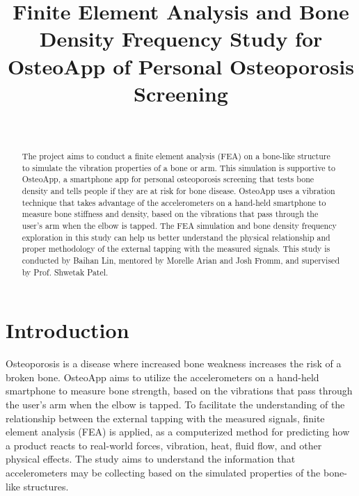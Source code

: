 \documentclass{sigchi}
\begin{document}
\title{Finite Element Analysis and Bone Density Frequency Study for OsteoApp of Personal Osteoporosis Screening}

\author{%
  \\
}

\maketitle

\begin{abstract}
The project aims to conduct a finite element analysis (FEA) on a bone-like structure to simulate the vibration properties of a bone or arm. This simulation is supportive to OsteoApp, a smartphone app for personal osteoporosis screening that tests bone density and tells people if they are at risk for bone disease. OsteoApp uses a vibration technique that takes advantage of the accelerometers on a hand-held smartphone to measure bone stiffness and density, based on the vibrations that pass through the user's arm when the elbow is tapped. The FEA simulation and bone density frequency exploration in this study can help us better understand the physical relationship and proper methodology of the external tapping with the measured signals. This study is conducted by Baihan Lin, mentored by Morelle Arian and Josh Fromm, and supervised by Prof. Shwetak Patel.

\end{abstract}



\section{Introduction}

Osteoporosis is a disease where increased bone weakness increases the risk of a broken bone. OsteoApp aims to utilize the accelerometers on a hand-held smartphone to measure bone strength, based on the vibrations that pass through the user's arm when the elbow is tapped. To facilitate the understanding of the relationship between the external tapping with the measured signals, finite element analysis (FEA) is applied, as a computerized method for predicting how a product reacts to real-world forces, vibration, heat, fluid flow, and other physical effects. The study aims to understand the information that accelerometers may be collecting based on the simulated properties of the bone-like structures. \\
\end{document}
